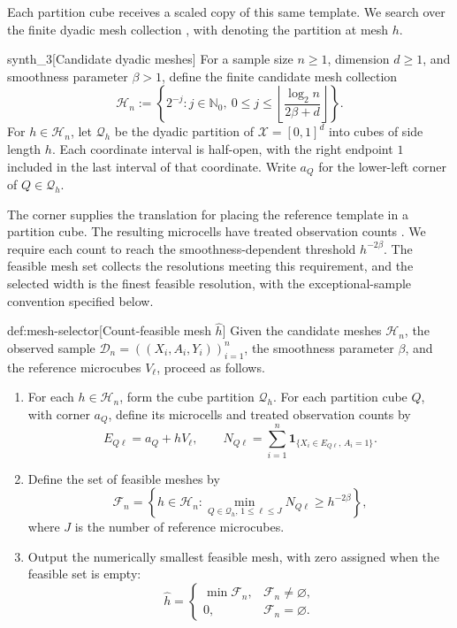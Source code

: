 Each partition cube receives a scaled copy of this same template. We search over the finite dyadic mesh collection , with  denoting the partition at mesh \(h\).

\begin{definitionv}{synth_3}[Candidate dyadic meshes]
For a sample size \(n\ge1\), dimension \(d\ge1\), and smoothness parameter \(\beta>1\), define the finite candidate mesh collection
\[
\mathcal H_n:=
\left\{2^{-j}:j\in\mathbb N_0,\ 
0\le j\le
\left\lfloor\frac{\log_2 n}{2\beta+d}\right\rfloor
\right\}.
\]
For \(h\in\mathcal H_n\), let \(\mathcal Q_h\) be the dyadic partition of
\(\mathcal X=[0,1]^d\) into cubes of side length \(h\). Each coordinate interval is half-open, with the right endpoint \(1\) included in the last interval of that coordinate. Write \(a_Q\) for the lower-left corner of \(Q\in\mathcal Q_h\).
\end{definitionv}

The corner  supplies the translation for placing the reference template in a partition cube. The resulting microcells  have treated observation counts . We require each count to reach the smoothness-dependent threshold \(h^{-2\beta}\). The feasible mesh set  collects the resolutions meeting this requirement, and the selected width  is the finest feasible resolution, with the exceptional-sample convention specified below.

\begin{algorithmv}{def:mesh-selector}[Count-feasible mesh $\widehat h$]
Given the candidate meshes \(\mathcal H_n\), the observed sample \(\mathcal D_n=((X_i,A_i,Y_i))_{i=1}^n\), the smoothness parameter \(\beta\), and the reference microcubes \(V_\ell\), proceed as follows.
\begin{enumerate}
\item For each \(h\in\mathcal H_n\), form the cube partition \(\mathcal Q_h\). For each partition cube \(Q\), with corner \(a_Q\), define its microcells and treated observation counts by
\[
E_{Q\ell}=a_Q+hV_\ell,
\qquad
N_{Q\ell}=\sum_{i=1}^n\mathbf 1_{\{X_i\in E_{Q\ell},\,A_i=1\}}.
\]
\item Define the set of feasible meshes by
\[
\mathcal F_n
=
\left\{h\in\mathcal H_n:
\min_{Q\in\mathcal Q_h,\,1\le\ell\le J}N_{Q\ell}
\ge h^{-2\beta}\right\},
\]
where \(J\) is the number of reference microcubes.
\item Output the numerically smallest feasible mesh, with zero assigned when the feasible set is empty:
\[
\widehat h=
\begin{cases}
\min\mathcal F_n,&\mathcal F_n\ne\varnothing,\\
0,&\mathcal F_n=\varnothing.
\end{cases}
\]
\end{enumerate}
\end{algorithmv}

